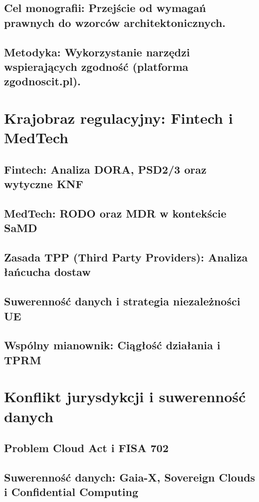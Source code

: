 \documentclass[12pt,a4paper,oneside]{book}
\begin{document}
\section{Cel monografii: Przejście od wymagań prawnych do wzorców architektonicznych.}
\section{Metodyka: Wykorzystanie narzędzi wspierających zgodność (platforma zgodnoscit.pl).}

\chapter{Krajobraz regulacyjny: Fintech i MedTech}

\section{Fintech: Analiza DORA, PSD2/3 oraz wytyczne KNF}
\section{MedTech: RODO oraz MDR w kontekście SaMD}
\section{Zasada TPP (Third Party Providers): Analiza łańcucha dostaw}
\section{Suwerenność danych i strategia niezależności UE}
\section{Wspólny mianownik: Ciągłość działania i TPRM}

\chapter{Konflikt jurysdykcji i suwerenność danych}

\section{Problem Cloud Act i FISA 702}
\section{Suwerenność danych: Gaia-X, Sovereign Clouds i Confidential Computing}
\end{document}
